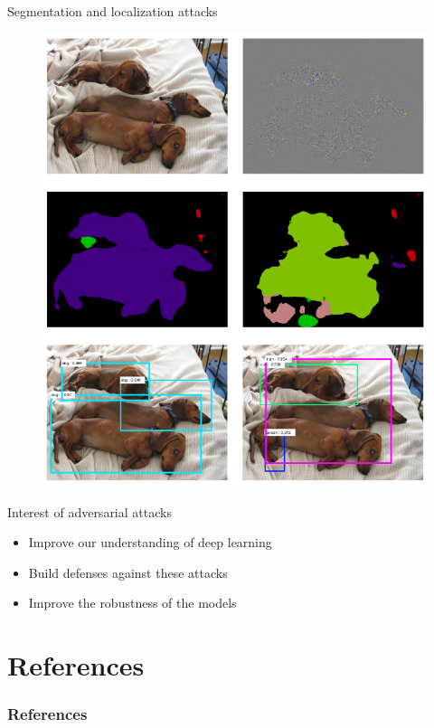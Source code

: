 \documentclass[xcolor=pdftex,dvipsnames,table,mathserif]{beamer}
\begin{document}
\begin{frame}{Segmentation and localization attacks\cite{xie2017}}

  \begin{figure}[ht]
    \centering
    \includegraphics[height=0.8\textheight]{../graphics/segm_loc_attacks}
  \end{figure}


\end{frame}


\begin{frame}{Interest of adversarial attacks}

\begin{itemize}
\item Improve our understanding of deep learning
\item Build defenses against these attacks
\item Improve the robustness of the models
\end{itemize}

\end{frame}





\section{References}
\begin{frame}[allowframebreaks]
	\frametitle{References}
	
\end{frame}
\end{document}
